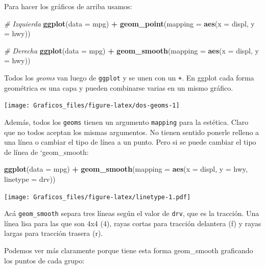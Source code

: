 \documentclass[]{book}
\newenvironment{Shaded}{\begin{snugshade}}{\end{snugshade}}
\newcommand{\CommentTok}[1]{\textcolor[rgb]{0.56,0.35,0.01}{\textit{#1}}}
\newcommand{\DataTypeTok}[1]{\textcolor[rgb]{0.13,0.29,0.53}{#1}}
\newcommand{\KeywordTok}[1]{\textcolor[rgb]{0.13,0.29,0.53}{\textbf{#1}}}
\newcommand{\NormalTok}[1]{#1}
\newcommand{\OperatorTok}[1]{\textcolor[rgb]{0.81,0.36,0.00}{\textbf{#1}}}
\newcommand{\StringTok}[1]{\textcolor[rgb]{0.31,0.60,0.02}{#1}}
\theoremstyle{definition}
\theoremstyle{definition}
\theoremstyle{definition}
\theoremstyle{remark}
\begin{document}
Para hacer los gráficos de arriba usamos:

\begin{Shaded}
\begin{Highlighting}[]
\CommentTok{# Izquierda}
\KeywordTok{ggplot}\NormalTok{(}\DataTypeTok{data =}\NormalTok{ mpg) }\OperatorTok{+}\StringTok{ }
\StringTok{  }\KeywordTok{geom_point}\NormalTok{(}\DataTypeTok{mapping =} \KeywordTok{aes}\NormalTok{(}\DataTypeTok{x =}\NormalTok{ displ, }\DataTypeTok{y =}\NormalTok{ hwy))}

\CommentTok{# Derecha}
\KeywordTok{ggplot}\NormalTok{(}\DataTypeTok{data =}\NormalTok{ mpg) }\OperatorTok{+}\StringTok{ }
\StringTok{  }\KeywordTok{geom_smooth}\NormalTok{(}\DataTypeTok{mapping =} \KeywordTok{aes}\NormalTok{(}\DataTypeTok{x =}\NormalTok{ displ, }\DataTypeTok{y =}\NormalTok{ hwy))}
\end{Highlighting}
\end{Shaded}

Todos los \emph{geoms} van luego de \texttt{ggplot} y se unen con un
\texttt{+}. En ggplot cada forma geométrica es una capa y pueden
combinarse varias en un mismo gráfico.

\texttt{[image: Graficos\_files/figure-latex/dos-geoms-1]}

Además, todos los \texttt{geoms} tienen un argumento \texttt{mapping}
para la estética. Claro que no todos aceptan los mismas argumentos. No
tienen sentido ponerle relleno a una línea o cambiar el tipo de línea a
un punto. Pero si se puede cambiar el tipo de línea de `geom\_smooth:

\begin{Shaded}
\begin{Highlighting}[]
\KeywordTok{ggplot}\NormalTok{(}\DataTypeTok{data =}\NormalTok{ mpg) }\OperatorTok{+}\StringTok{ }
\StringTok{  }\KeywordTok{geom_smooth}\NormalTok{(}\DataTypeTok{mapping =} \KeywordTok{aes}\NormalTok{(}\DataTypeTok{x =}\NormalTok{ displ, }\DataTypeTok{y =}\NormalTok{ hwy, }\DataTypeTok{linetype =}\NormalTok{ drv))}
\end{Highlighting}
\end{Shaded}

\texttt{[image: Graficos\_files/figure-latex/linetype-1.pdf]}

Acá \texttt{geom\_smooth} separa tres líneas según el valor de
\texttt{drv}, que es la tracción. Una línea lisa para las que son 4x4
(4), rayas cortas para tracción delantera (f) y rayas largas para
tracción trasera (r).

Podemos ver más claramente porque tiene esta forma geom\_smooth
graficando los puntos de cada grupo:
\end{document}
